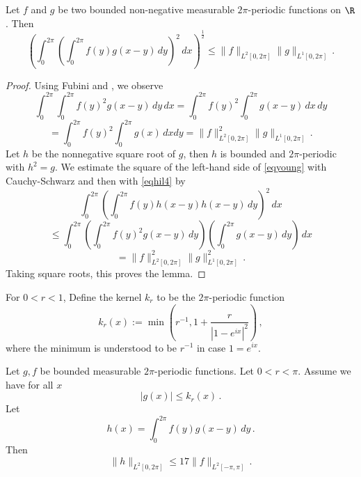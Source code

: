 \begin{lemma}\label{Young-convolution}
\leanok
{}
    Let $f$ and $g$ be two bounded non-negative measurable $2\pi$-periodic functions on $\R$. Then
    \begin{equation}\label{eqyoung}
        \left(\int_0^{2\pi} \left(\int_0^{2\pi}
        f(y)g(x-y)\, dy\right)^2\, dx\right)^{\frac 12}\le \|f\|_{L^2[0, 2\pi]} \|g\|_{L^1[0, 2\pi]}\, .
    \end{equation}
    \end{lemma}
\begin{proof}
\leanok
    Using Fubini and , we observe
\begin{equation*}
  \int_0^{2\pi}\int_0^{2\pi}f(y)^2g(x-y)\, dy
    \, dx=\int_0^{2\pi}f(y)^2\int_0^{2\pi}g(x-y)\, dx
    \, dy
\end{equation*}
\begin{equation}\label{eqhil4}
=\int_0^{2\pi}f(y)^2\int_0^{2\pi}g(x) \, dx
     dy
=\|f\|_{L^2[0, 2\pi]}^2\|g\|_{L^1[0, 2\pi]}\, .
\end{equation}
   Let $h$ be the nonnegative square root of $g$, then
   $h$ is bounded and $2\pi$-periodic with $h^2=g$.
   We estimate the square of the left-hand side of
   \eqref{eqyoung} with Cauchy-Schwarz and then with
   \eqref{eqhil4} by
       \begin{equation*}
         \int_0^{2\pi} (\int_0^{2\pi}f(y)h(x-y)h(x-y)\, dy)^2\, dx
   \end{equation*}
\begin{equation*}
    \le \int_0^{2\pi}\left(\int_0^{2\pi}f(y)^2g(x-y)\, dy\right)
    \left(\int_0^{2\pi}g(x-y)\, dy\right)\, dx
\end{equation*}
\begin{equation*}
    = \|f\|_{L^2[0, 2\pi]}^2\|g\|_{L^1[0, 2\pi]}^2\, .
\end{equation*}
Taking square roots, this proves the lemma.
\end{proof}

For $0<r<1$, Define the kernel $k_r$ to be the $2\pi$-periodic function
\begin{equation}
    k_r(x):=\min \left(r^{-1}, 1+\frac r{|1-e^{ix}|^2}\right)\, ,
\end{equation}
where the minimum is understood to be $r^{-1}$ in case $1=e^{ix}$.
\begin{lemma}
\label{integrable-bump-convolution}
\leanok
{}
Let $g,f$ be bounded measurable $2\pi$-periodic functions. Let $0<r<\pi$.
Assume we have for all $x$
\begin{equation}\label{ebump1}
    |g(x)|\le k_r(x)\, .
\end{equation}
Let
\begin{equation}
   h(x)= \int_0^{2\pi} f(y)g(x-y)\, dy \, .
\end{equation}
Then
\begin{equation}
   \|h\|_{L^2[0, 2\pi]}\le 17\|f\|_{L^2[-\pi, \pi]} \, .
\end{equation}

\end{lemma}

